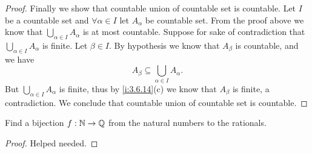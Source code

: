 \begin{proof}
  Finally we show that countable union of countable set is countable.
  Let \(I\) be a countable set and \(\forall \alpha \in I\) let \(A_{\alpha}\) be countable set.
  From the proof above we know that \(\bigcup_{\alpha \in I} A_{\alpha}\) is at most countable.
  Suppose for sake of contradiction that \(\bigcup_{\alpha \in I} A_{\alpha}\) is finite.
  Let \(\beta \in I\).
  By hypothesis we know that \(A_{\beta}\) is countable, and we have
  \[
    A_{\beta} \subseteq \bigcup_{\alpha \in I} A_{\alpha}.
  \]
  But \(\bigcup_{\alpha \in I} A_{\alpha}\) is finite, thus by \cref{i:3.6.14}(c) we know that \(A_{\beta}\) is finite, a contradiction.
  We conclude that countable union of countable set is countable.
\end{proof}

\begin{ex}\label{i:ex:8.1.10}
  Find a bijection \(f : \mathbb{N} \to \mathbb{Q}\) from the natural numbers to the rationals.
\end{ex}

\begin{proof}
  Helped needed.
\end{proof}
